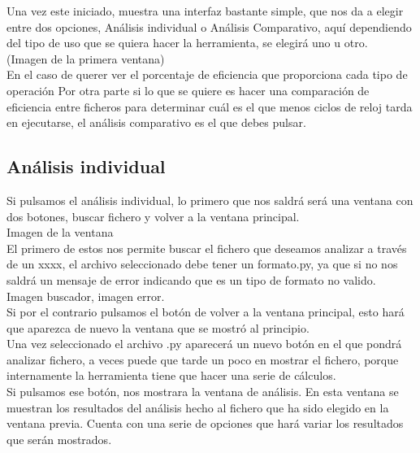 Una vez este iniciado, muestra una interfaz bastante simple, que nos da a elegir entre dos opciones, Análisis individual o Análisis Comparativo, aquí dependiendo del tipo de uso que se quiera hacer la herramienta, se elegirá uno u otro.\\

(Imagen de la primera ventana)\\

En el caso de querer ver el porcentaje de eficiencia que proporciona cada tipo de operación
Por otra parte si lo que se quiere es hacer una comparación de eficiencia entre ficheros para determinar cuál es el que menos ciclos de reloj tarda en ejecutarse, el análisis comparativo es el que debes pulsar.


\subsection{Análisis individual}

Si pulsamos el análisis individual, lo primero que nos saldrá será una ventana con dos botones, buscar fichero y volver a la ventana principal.\\

Imagen de la ventana \\

El primero de estos nos permite buscar el fichero que deseamos analizar a través de un xxxx, el archivo seleccionado debe tener un formato.py, ya que si no nos saldrá un mensaje de error indicando que es un tipo de formato no valido.\\

Imagen buscador, imagen error.\\

Si por el contrario pulsamos el botón de volver a la ventana principal, esto hará que aparezca de nuevo la ventana que se mostró al principio.\\

Una vez seleccionado el archivo .py aparecerá un nuevo botón en el que pondrá analizar fichero, a veces puede que tarde un poco en mostrar el fichero, porque internamente la herramienta tiene que hacer una serie de cálculos.\\

Si pulsamos ese botón, nos mostrara la ventana de análisis. En esta ventana se muestran los resultados del análisis hecho al fichero que ha sido elegido en la ventana previa. Cuenta con una serie de opciones que hará variar los resultados que serán mostrados.\\


